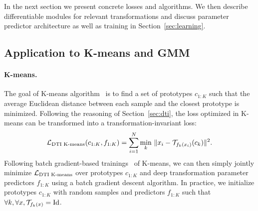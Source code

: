 \documentclass{article}
\DeclareMathOperator{\id}{Id}
\begin{document}
\vspace{-0.3em}
In the next section we present concrete losses and algorithms. We then describe 
differentiable modules for relevant transformations and discuss parameter predictor 
architecture as well as training in Section~\ref{sec:learning}. 

\subsection{Application to K-means and GMM}

\paragraph{K-means.}
The goal of K-means algorithm~\cite{macqueenMethodsClassificationAnalysis1967} is to find a 
set of prototypes $c_{1:K}$ such that the average Euclidean distance between each sample and 
the closest prototype is minimized. Following the reasoning of Section~\ref{sec:dti}, the 
loss optimized in K-means can be transformed into a transformation-invariant loss:\begin{equation}
  \mathcal{L}_{\textrm{DTI K-means}}(c_{1:K},f_{1:K})= \sum_{i=1}^N   
  \underset{k}{\min}~\|x_i - {\mathcal T}_{f_k(x_i)}(c_k)\|^2.
  \label{eq:dtikmeans}
\end{equation}
Following batch gradient-based trainings~\cite{bottouConvergencePropertiesKmeans1995} of 
K-means, we can then simply jointly minimize ${\mathcal L}_{\textrm{DTI K-means}}$ over prototypes 
$c_{1:K}$ and deep transformation parameter predictors $f_{1:K}$ using a batch gradient 
descent algorithm. In practice, we initialize prototypes $c_{1:K}$ with random samples and 
predictors $f_{1:K}$ such that $\forall k,\forall x,\cT_{f_k(x)} = \id$.
\end{document}
